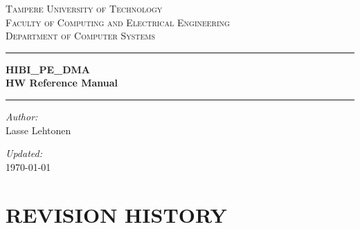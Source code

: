 \documentclass[a4paper,10pt,oneside,final]{article}
\author{\defauthor}
\title{\deftitle}
\def\defauthor{Lasse Lehtonen}
\begin{document}

\begin{titlepage}
\begin{center}

\vspace{6.0cm}
\textsc{\LARGE Tampere University of Technology}\\[1.0cm]
\textsc{\Large Faculty of Computing and Electrical Engineering}\\[1.0cm]
\textsc{\Large Department of Computer Systems}\\[1.0cm]
\vspace{6.0cm}
\hrule
\vspace{0.4cm}
{ \huge \bfseries HIBI\_PE\_DMA\\\vspace{10pt}HW Reference Manual}
\vspace{0.4cm}
\hrule


\vfill

\begin{minipage}{0.4\textwidth}
\begin{flushleft} \large
\emph{Author:}\\
\defauthor
\end{flushleft}
\end{minipage}
\begin{minipage}{0.4\textwidth}
\begin{flushright} \large
\emph{Updated:} \\
\today
\end{flushright}
\end{minipage}

\end{center}
\end{titlepage}

\newpage
\tableofcontents



\newpage
\section{REVISION HISTORY}
\setcounter{page}{1}
\end{document}
